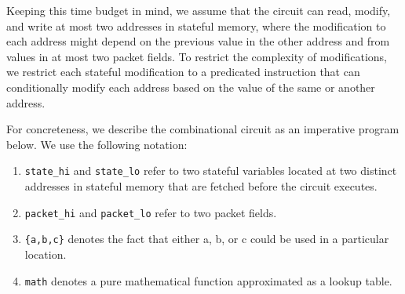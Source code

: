 Keeping this time budget in mind, we assume that the circuit can read, modify,
and write at most two addresses in stateful memory, where the modification to
each address might depend on the previous value in the other address and from
values in at most two packet fields. To restrict the complexity of
modifications, we restrict each stateful modification to a predicated
instruction that can conditionally modify each address based on the value of
the same or another address.

For concreteness, we describe the combinational circuit as an imperative
program below. We use the following notation:
\begin{enumerate}
\item \texttt{state\_hi} and \texttt{state\_lo} refer to two stateful variables
  located at two distinct addresses in stateful memory that are fetched before
  the circuit executes.
\item \texttt{packet\_hi} and \texttt{packet\_lo} refer to two packet fields.
\item \texttt{\{a,b,c\}} denotes the fact that either a, b, or c could be used
in a particular location.
\item \texttt{math} denotes a pure mathematical function approximated as a lookup
  table.
\end{enumerate}

